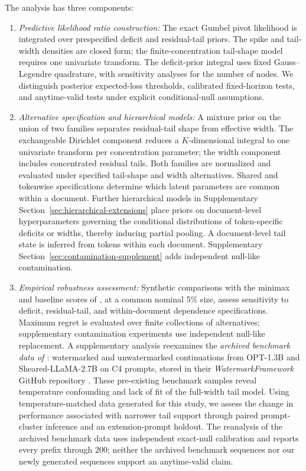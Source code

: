 \documentclass[11pt]{article}
\begin{document}
The analysis has three components:
\begin{enumerate}
  \item {\em Predictive likelihood ratio construction:} The exact Gumbel pivot likelihood is integrated over prespecified deficit and residual-tail priors.  The spike and tail-width densities are closed form; the finite-concentration tail-shape model requires one univariate transform.  The deficit-prior integral uses fixed Gauss--Legendre quadrature, with sensitivity analyses for the number of nodes.  We distinguish posterior expected-loss thresholds, calibrated fixed-horizon tests, and anytime-valid tests under explicit conditional-null assumptions.

  \item {\em Alternative specification and hierarchical models:} A mixture prior on the union of two families separates residual-tail shape from effective width.  The exchangeable Dirichlet component reduces a $K$-dimensional integral to one univariate transform per concentration parameter; the width component includes concentrated residual tails.  Both families are normalized and evaluated under specified tail-shape and width alternatives.  Shared and tokenwise specifications determine which latent parameters are common within a document.  Further hierarchical models in Supplementary Section~\ref{sec:hierarchical-extensions} place priors on document-level hyperparameters governing the conditional distributions of token-specific deficits or widths, thereby inducing partial pooling.  A document-level tail state is inferred from tokens within each document.  Supplementary Section~\ref{sec:contamination-supplement} adds independent null-like contamination.

  \item {\em Empirical robustness assessment:} Synthetic comparisons with the minimax and baseline scores of \citet{li2025framework}, at a common nominal 5\% size, assess sensitivity to deficit, residual-tail, and within-document dependence specifications.  Maximum regret is evaluated over finite collections of alternatives; supplementary contamination experiments use independent null-like replacement.  A supplementary analysis reexamines the \emph{archived benchmark data of \citet{li2025framework}}: watermarked and unwatermarked continuations from OPT-1.3B and Sheared-LLaMA-2.7B on C4 prompts, stored in their \emph{WatermarkFramework} GitHub repository \citep{li2024watermarkframework}.  These pre-existing benchmark samples reveal temperature confounding and lack of fit of the full-width tail model.  Using temperature-matched data generated for this study, we assess the change in performance associated with narrower tail support through paired prompt-cluster inference and an extension-prompt holdout.  The reanalysis of the archived benchmark data uses independent exact-null calibration and reports every prefix through 200; neither the archived benchmark sequences nor our newly generated sequences support an anytime-valid claim.
\end{enumerate}
\end{document}
